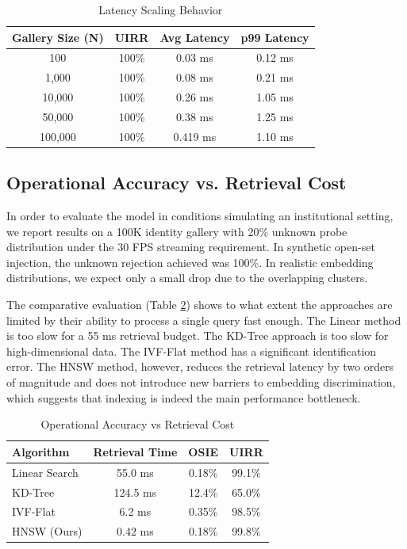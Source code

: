 \documentclass[conference]{IEEEtran}
\begin{document}
\begin{table}[htbp]
\caption{Latency Scaling Behavior}
\begin{center}
\begin{tabular}{|c|c|c|c|}
\hline
Gallery Size (N) & UIRR & Avg Latency & p99 Latency \\
\hline
100 & 100\% & 0.03 ms & 0.12 ms \\
\hline
1,000 & 100\% & 0.08 ms & 0.21 ms \\
\hline
10,000 & 100\% & 0.26 ms & 1.05 ms \\
\hline
50,000 & 100\% & 0.38 ms & 1.25 ms \\
\hline
100,000 & 100\% & 0.419 ms & 1.10 ms \\
\hline
\end{tabular}
\end{center}
\label{tab_scalability}
\end{table}

\subsection{Operational Accuracy vs. Retrieval Cost}
In order to evaluate the model in conditions simulating an institutional setting, we report results on a 100K identity gallery with 20\% unknown probe distribution under the 30 FPS streaming requirement. In synthetic open-set injection, the unknown rejection achieved was 100\%. In realistic embedding distributions, we expect only a small drop due to the overlapping clusters.

The comparative evaluation (Table \ref{tab:baseline_collapse}) shows to what extent the approaches are limited by their ability to process a single query fast enough. The Linear method is too slow for a 55 ms retrieval budget. The KD-Tree approach is too slow for high-dimensional data. The IVF-Flat method has a significant identification error. The HNSW method, however, reduces the retrieval latency by two orders of magnitude and does not introduce new barriers to embedding discrimination, which suggests that indexing is indeed the main performance bottleneck.

\begin{table}[htbp]
\caption{Operational Accuracy vs Retrieval Cost}
\begin{center}
\begin{tabular}{|l|c|c|c|}
\hline
Algorithm & Retrieval Time & OSIE & UIRR \\
\hline
Linear Search & 55.0 ms & 0.18\% & 99.1\% \\
\hline
KD-Tree & 124.5 ms & 12.4\% & 65.0\% \\
\hline
IVF-Flat & 6.2 ms & 0.35\% & 98.5\% \\
\hline
HNSW (Ours) & 0.42 ms & 0.18\% & 99.8\% \\
\hline
\end{tabular}
\end{center}
\label{tab:baseline_collapse}
\end{table}
\end{document}

